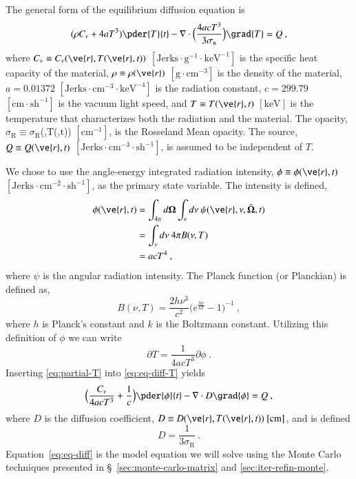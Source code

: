 \documentclass[preprint,12pt]{elsarticle}
\newcommand{\Cv}{\ensuremath{C_{v}}}
\newcommand{\ros}{\ensuremath{\sigma_{\scriptscriptstyle\mathrm{R}}}}
\newcommand{\bOmega}{\ensuremath{\mathbf{\Omega}}}
\begin{document}
The general form of the equilibrium diffusion equation is
\cite{morel_1996}
\begin{equation} 
  (\rho\Cv + 4aT^{3})\pder{T}{t} -
  \nabla\cdot{\Bigl(\frac{4acT^{3}}{3\ros}\Bigr)\grad{T}} = Q\:,
  \label{eq:eq-diff-T}
\end{equation}
where $\Cv\equiv\Cv(\ve{r},T(\ve{r},t))$
$[\text{Jerks}\cdot\text{g}^{-1}\cdot\text{keV}^{-1}]$ is the specific
heat capacity of the material, $\rho\equiv\rho(\ve{r})$
$[\text{g}\cdot\text{cm}^{-3}]$ is the density of the material,
$a=0.01372$ $[\text{Jerks}\cdot\text{cm}^{-3}\cdot\text{keV}^{-4}]$ is
the radiation constant, $c=299.79$ $[\text{cm}\cdot\text{sh}^{-1}]$ is
the vacuum light speed, and $T\equiv T(\ve{r},t)$ $[\text{keV}]$ is
the temperature that characterizes both the radiation and the
material.  The opacity, $\ros\equiv\ros$(,T(,t))
$[\text{cm}^{-1}]$, is the Rosseland Mean opacity.  The source,
$Q\equiv Q(\ve{r},t)$
$[\text{Jerks}\cdot\text{cm}^{-3}\cdot\text{sh}^{-1}]$, is assumed to
be independent of $T$.

We chose to use the angle-energy integrated radiation intensity,
$\phi\equiv\phi(\ve{r},t)$
$[\text{Jerks}\cdot\text{cm}^{-2}\cdot\text{sh}^{-1}]$, as the primary
state variable.  The intensity is defined,
\begin{equation}
  \label{eq:lte-phi}
  \begin{split}
    \phi(\ve{r},t) &=
    \int_{4\pi}d\bOmega\int_{\nu}d\nu\:\psi(\ve{r},\nu,\hat{\bOmega},t) \\
    &= \int_{\nu}d\nu\: 4\pi B(\nu,T) \\
    &= acT^{4}\:,
  \end{split}
\end{equation}
where $\psi$ is the angular radiation intensity.  The Planck function
(or Planckian) is defined as,
\begin{equation}
  B(\nu,T)=\frac{2h\nu^{3}}{c^{2}}\bigl(e^{\frac{h\nu}{kT}} -
  1\bigr)^{-1}\:,
\end{equation}
where $h$ is Planck's constant and $k$ is the Boltzmann constant.
Utilizing this definition of $\phi$ we can write
\begin{equation}
  \label{eq:partial-T}
  \partial T = \frac{1}{4acT^{3}}\partial\phi\:.
\end{equation}
Inserting \eqref{eq:partial-T} into \eqref{eq:eq-diff-T} yields
\begin{equation}
  \label{eq:eq-diff}
  \Bigl(\frac{\Cv}{4acT^{3}} + \frac{1}{c}\Bigr)\pder{\phi}{t} - 
  \nabla\cdot D\grad{\phi} = Q\:,
\end{equation}
where $D$ is the diffusion coefficient, $D\equiv
D(\ve{r},T(\ve{r},t))\ [\text{cm}]$, and is defined
\begin{equation}
  D = \frac{1}{3\ros}\:.
\end{equation}
Equation~\eqref{eq:eq-diff} is the model equation we will solve using
the Monte Carlo techniques presented in
\S~\ref{sec:monte-carlo-matrix} and \ref{sec:iter-refin-monte}.
\end{document}
